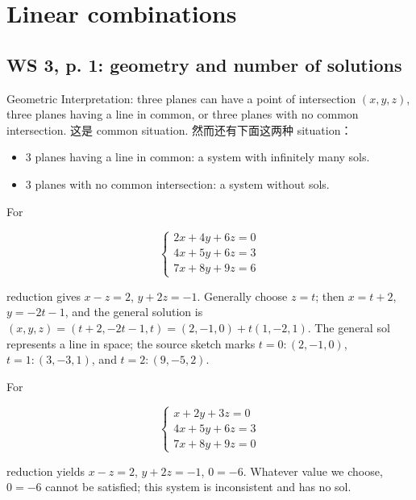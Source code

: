 \chapter{Linear combinations}

\section{WS 3, p. 1: geometry and number of solutions}

Geometric Interpretation: three planes can have a point of intersection \(\left( {x,y,z} \right)\), three planes having a line in common, or three planes with no common intersection. 这是 common situation. 然而还有下面这两种 situation：

\begin{itemize}
\tightlist
\item
  \(3\) planes having a line in common: a system with infinitely many sols.
\item
  \(3\) planes with no common intersection: a system without sols.
\end{itemize}

For

\[\left\{ \begin{matrix}
{2x + 4y + 6z = 0} \\
{4x + 5y + 6z = 3} \\
{7x + 8y + 9z = 6}
\end{matrix} \right.\]

reduction gives \(x - z = 2\), \(y + 2z = - 1\). Generally choose \(z = t\); then \(x = t + 2\), \(y = - 2t - 1\), and the general solution is \(\left( {x,y,z} \right) = \left( {t + 2, - 2t - 1,t} \right) = \left( {2, - 1,0} \right) + t\left( {1, - 2,1} \right)\). The general sol represents a line in space; the source sketch marks \(t = 0:\left( {2, - 1,0} \right)\), \(t = 1:\left( {3, - 3,1} \right)\), and \(t = 2:\left( {9, - 5,2} \right)\).

For

\[\left\{ \begin{matrix}
{x + 2y + 3z = 0} \\
{4x + 5y + 6z = 3} \\
{7x + 8y + 9z = 0}
\end{matrix} \right.\]

reduction yields \(x - z = 2\), \(y + 2z = - 1\), \(0 = - 6\). Whatever value we choose, \(0 = - 6\) cannot be satisfied; this system is inconsistent and has no sol.

